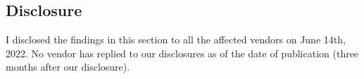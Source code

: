 


\subsection{Disclosure}
\label{sec:disclosure}

I disclosed the findings in this section to all the affected
vendors on June 14th, 2022. No vendor has replied to our disclosures as of the date of
publication (three months after our disclosure).
